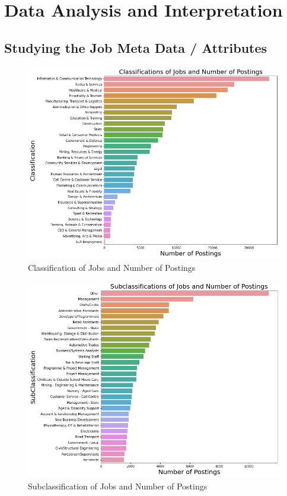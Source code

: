\documentclass[twoside, 12pt, a4paper]{article}
\begin{document}
\newpage 
\section{Data Analysis and Interpretation}
\subsection{Studying the Job Meta Data / Attributes}

\begin{figure}[h]
	\centering
	\includegraphics[scale = 0.45]{ClassVsPostings.png}
	\caption{Classification of Jobs and Number of Postings}
	\label{fig:ClassVsPosts}
\end{figure}

\begin{figure}[h!]
	\centering
	\includegraphics[scale = 0.45]{SubClassVsPostings.png}
	\caption{Subclassification of Jobs and Number of Postings}
	\label{fig:SubClassVsPosts}
\end{figure}
\end{document}
